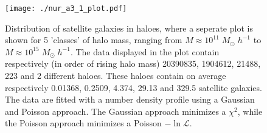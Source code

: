 

\newpage

\begin{figure}[!ht]
  \centering
  \texttt{[image: ./nur\_a3\_1\_plot.pdf]}
  \caption{Distribution of satellite galaxies in haloes, where a seperate plot is shown for 5 'classes' of halo mass, ranging from $M \approx 10^{11} \; M_{\odot} \; h^{-1}$ to $M \approx 10^{15} \; M_{\odot} \; h^{-1}$. The data displayed in the plot contain respectively (in order of rising halo mass) 20390835, 1904612, 21488, 223 and 2 different haloes. These haloes contain on average respectively 0.01368, 0.2509, 4.374, 29.13 and 329.5 satellite galaxies. The data are fitted with a number density profile using a Gaussian and Poisson approach. The Gaussian approach minimizes a $\chi^{2}$, while the Poisson approach minimizes a Poisson $-\ln \mathcal{L}$.}
  \label{fig:ex1}
\end{figure}


